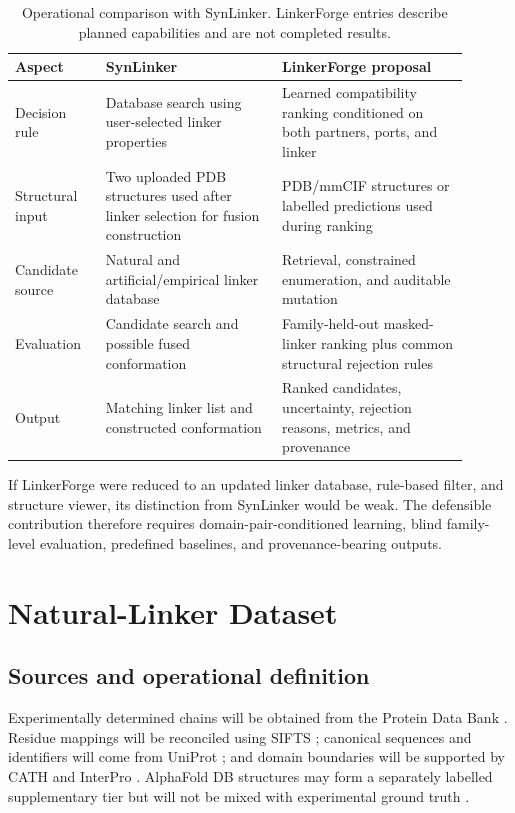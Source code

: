\documentclass[10pt,a4paper]{article}
\begin{document}
\begin{table}[t]
  \caption{Operational comparison with SynLinker. LinkerForge entries describe planned capabilities and are not completed results.}
  \label{tab:synlinker}
  \centering
  \small
  \begin{tabular}{p{0.18\linewidth}p{0.35\linewidth}p{0.37\linewidth}}
    \toprule
    Aspect & SynLinker & LinkerForge proposal \\
    \midrule
    Decision rule & Database search using user-selected linker properties & Learned compatibility ranking conditioned on both partners, ports, and linker \\
    Structural input & Two uploaded PDB structures used after linker selection for fusion construction & PDB/mmCIF structures or labelled predictions used during ranking \\
    Candidate source & Natural and artificial/empirical linker database & Retrieval, constrained enumeration, and auditable mutation \\
    Evaluation & Candidate search and possible fused conformation & Family-held-out masked-linker ranking plus common structural rejection rules \\
    Output & Matching linker list and constructed conformation & Ranked candidates, uncertainty, rejection reasons, metrics, and provenance \\
    \bottomrule
  \end{tabular}
\end{table}

If LinkerForge were reduced to an updated linker database, rule-based filter, and structure viewer, its distinction from SynLinker would be weak. The defensible contribution therefore requires domain-pair-conditioned learning, blind family-level evaluation, predefined baselines, and provenance-bearing outputs.

\section{Natural-Linker Dataset}

\subsection{Sources and operational definition}

Experimentally determined chains will be obtained from the Protein Data Bank \citep{burley2022}. Residue mappings will be reconciled using SIFTS \citep{dana2019}; canonical sequences and identifiers will come from UniProt \citep{uniprot2025}; and domain boundaries will be supported by CATH and InterPro \citep{waman2025,blum2025}. AlphaFold DB structures may form a separately labelled supplementary tier but will not be mixed with experimental ground truth \citep{varadi2022}.
\end{document}
